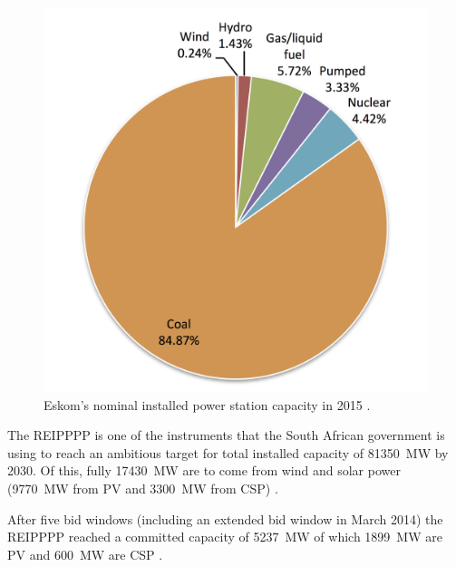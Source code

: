\begin{figure}[htbp]  
\centering
\includegraphics[width=0.45\linewidth]{FIG/Pgenerationeskom}
\caption[Eskom's nominal installed power station capacity in 2015.]{Eskom's nominal installed power station capacity in 2015 \cite{Eskom2015a}.}\label{PgenerationEskom}
\end{figure}
%
The REIPPPP is one of the instruments that the South African government is using to reach an ambitious target for total installed capacity of \SI{81350}{\mega\watt} by 2030. Of this, fully \SI{17430}{\mega\watt} are to come from wind and solar power (\SI{9770}{\mega\watt} from PV and \SI{3300}{\mega\watt} from CSP) \cite{DoE2013}.

After five bid windows (including an extended bid window in March 2014) the REIPPPP reached a committed capacity of \SI{5237}{\mega\watt} of which \SI{1899}{\mega\watt} are PV and \SI{600}{\mega\watt} are CSP \cite{DoE2015}.


